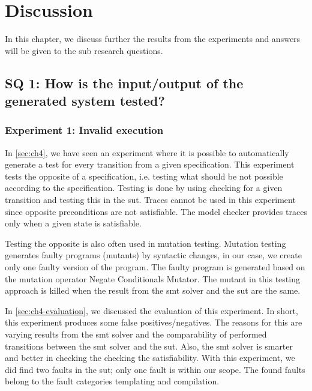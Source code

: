 \chapter{Discussion}\label{sec:ch6}

In this chapter, we discuss further the results from the experiments and answers
will be given to the sub research questions.

\section{SQ 1: How is the input/output of the generated system tested?}

\subsection{Experiment 1: Invalid execution}
In \autoref{sec:ch4}, we have seen an experiment where it is possible to
automatically generate a test for every transition from a given specification.
This experiment tests the opposite of a specification, i.e. testing what should
be not possible according to the specification. Testing is done by using
checking for a given transition and testing this in the \gls{sut}.
Traces cannot be used in this experiment since opposite preconditions are not
satisfiable. The model checker provides traces only when a given state is
satisfiable.

Testing the opposite is also often used in mutation testing. Mutation testing
generates faulty programs (mutants) by syntactic changes, in our case, we create
only one faulty version of the program. The faulty program is generated based on
the mutation operator Negate Conditionals Mutator. The mutant in this testing
approach is killed when the result from the \gls{smt} solver and the \gls{sut}
are the same.

In \autoref{sec:ch4-evaluation}, we discussed the evaluation of this experiment.
In short, this experiment produces some false positives/negatives. The reasons
for this are varying results from the \gls{smt} solver and the comparability of
performed transitions between the \gls{smt} solver and the \gls{sut}. Also, the
\gls{smt} solver is smarter and better in checking the checking the
satisfiability. With this experiment, we did find two faults in the \gls{sut};
only one fault is within our scope. The found faults belong to the fault categories
templating and compilation.

